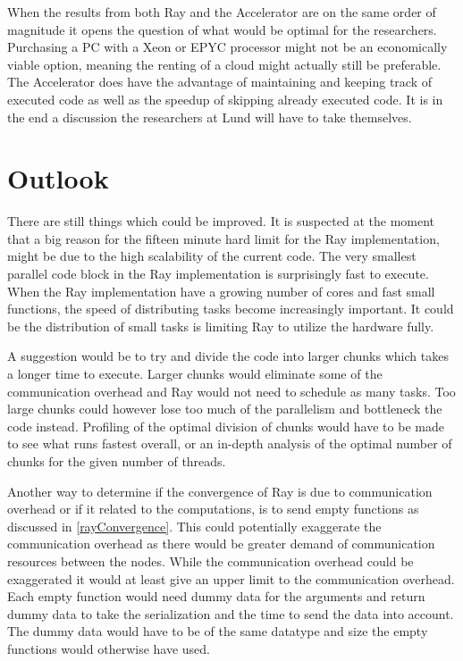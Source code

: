 \documentclass[12pt, a4paper]{article}
\begin{document}
When the results from both Ray and the Accelerator are on the same order of magnitude it opens the question of what would be optimal for the researchers.
Purchasing a PC with a Xeon or EPYC processor might not be an economically viable option, meaning the renting of a cloud might actually still be preferable.
The Accelerator does have the advantage of maintaining and keeping track of executed code as well as the speedup of skipping already executed code.
It is in the end a discussion the researchers at Lund will have to take themselves.


\section{Outlook}

There are still things which could be improved.
It is suspected at the moment that a big reason for the fifteen minute hard limit for the Ray implementation, might be due to the high scalability of the current code.
The very smallest parallel code block in the Ray implementation is surprisingly fast to execute.
When the Ray implementation have a growing number of cores and fast small functions, the speed of distributing tasks become increasingly important.
It could be the distribution of small tasks is limiting Ray to utilize the hardware fully.

A suggestion would be to try and divide the code into larger chunks which takes a longer time to execute.
Larger chunks would eliminate some of the communication overhead and Ray would not need to schedule as many tasks.
Too large chunks could however lose too much of the parallelism and bottleneck the code instead.
Profiling of the optimal division of chunks would have to be made to see what runs fastest overall, or an in-depth analysis of the optimal number of chunks for the given number of threads.

Another way to determine if the convergence of Ray is due to communication overhead or if it related to the computations, is to send empty functions as discussed in \cref{rayConvergence}.
This could potentially exaggerate the communication overhead as there would be greater demand of communication resources between the nodes.
While the communication overhead could be exaggerated it would at least give an upper limit to the communication overhead.
Each empty function would need dummy data for the arguments and return dummy data to take the serialization and the time to send the data into account.
The dummy data would have to be of the same datatype and size the empty functions would otherwise have used.
\end{document}
